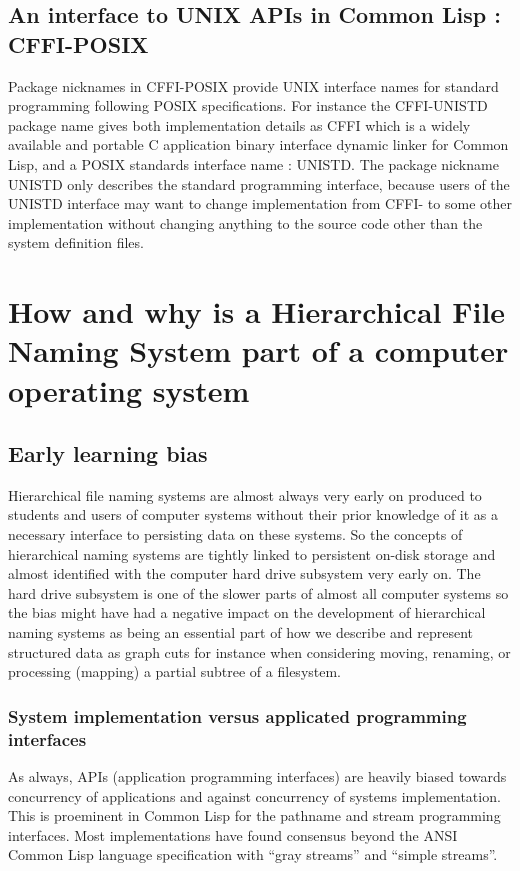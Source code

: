 \documentclass[sigconf]{acmart}
\begin{document}
\subsection{An interface to UNIX APIs in Common Lisp : CFFI-POSIX}

Package nicknames in CFFI-POSIX provide UNIX interface names for
standard programming following POSIX specifications. For instance the
CFFI-UNISTD package name gives both implementation details as
CFFI which is a widely available and portable C application binary
interface dynamic linker for Common Lisp, and a POSIX standards
interface name : UNISTD. The package nickname UNISTD only describes
the standard programming interface, because users of the UNISTD
interface may want to change implementation from CFFI- to some other
implementation without changing anything to the source code other than
the system definition files.


\section{How and why is a Hierarchical File Naming System part of a
  computer operating system}

\subsection{Early learning bias}
Hierarchical file naming systems are almost always very early on
produced to students and users of computer systems without their prior
knowledge of it as a necessary interface to persisting data on these
systems. So the concepts of hierarchical naming systems are tightly
linked to persistent on-disk storage and almost identified with the
computer hard drive subsystem very early on. The hard drive subsystem
is one of the slower parts of almost all computer systems so the bias
might have had a negative impact on the development of hierarchical
naming systems as being an essential part of how we describe and
represent structured data as graph cuts for instance when considering
moving, renaming, or processing (mapping) a partial subtree of a
filesystem.

\subsubsection{System implementation versus applicated programming
  interfaces}
As always, APIs (application programming interfaces) are heavily
biased towards concurrency of applications and against concurrency of
systems implementation. This is proeminent in Common Lisp for the
pathname and stream programming interfaces. Most implementations have
found consensus beyond the ANSI Common Lisp language specification
with ``gray streams'' and ``simple streams''.
\end{document}
